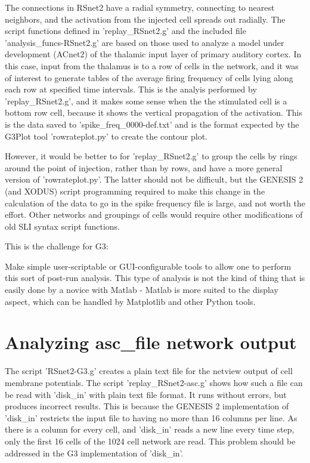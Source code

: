 \documentclass[10pt,a4paper,english]{article}
\begin{document}
The connections in RSnet2 have a radial symmetry, connecting to nearest
neighbors, and the activation from the injected cell spreads out radially.
The script functions defined in 'replay{\_}RSnet2.g' and the included file
'analysis{\_}funcs-RSnet2.g' are based on those used to analyze a model under
development (ACnet2) of the thalamic input layer of primary auditory
cortex.  In this case, input from the thalamus is to a row of cells in
the network, and it was of interest to generate tables of the average
firing frequency of cells lying along each row at specified time intervals.
This is the analyis performed by 'replay{\_}RSnet2.g', and it makes some sense
when the the stimulated cell is a bottom row cell, because it shows the
vertical propagation of the activation.  This is the data saved to
'spike{\_}freq{\_}0000-def.txt' and is the format expected by the G3Plot
tool 'rowrateplot.py' to create the contour plot.

However, it would be better to for 'replay{\_}RSnet2.g' to group the cells by
rings around the point of injection, rather than by rows, and have a more
general version of 'rowrateplot.py'.  The latter should not be difficult,
but the GENESIS 2 (and XODUS) script programming required to make this
change in the calculation of the data to go in the spike frequency file is
large, and not worth the effort.  Other networks and groupings of cells
would require other modifications of old SLI syntax script functions.

This is the challenge for G3:

Make simple user-scriptable or GUI-configurable tools to allow one to
perform this sort of post-run analysis.  This type of analysis is not the
kind of thing that is easily done by a novice with Matlab - Matlab is more
suited to the display aspect, which can be handled by Matplotlib and other
Python tools.



\hypertarget{analyzing-asc-file-network-output}{}
\section*{Analyzing asc{\_}file network output}
\label{analyzing-asc-file-network-output}

The script 'RSnet2-G3.g' creates a plain text file for the netview
output of cell membrane potentials.   The script 'replay{\_}RSnet2-asc.g'
shows how such a file can be read with 'disk{\_}in' with plain text file
format.  It runs without errors, but produces incorrect results.  This
is because the GENESIS 2 implementation of 'disk{\_}in' restricts the input file
to having no more than 16 columns per line.  As there is a column for
every cell, and 'disk{\_}in' reads a new line every time step, only the
first 16 cells of the 1024 cell network are read.  This problem should be
addressed in the G3 implementation of 'disk{\_}in'.
\end{document}
